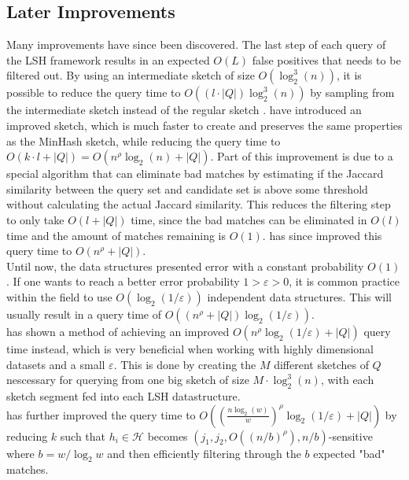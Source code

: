 \subsection{Later Improvements}
Many improvements have since been discovered. The last step of each query of the LSH framework results in an expected $O(L)$ false positives that needs to be filtered out. By using an intermediate sketch of size $O(\log_2^3(n))$, it is possible to reduce the query time to $O((l\cdot |Q|)\log_2^3(n))$ by sampling from the intermediate sketch instead of the regular sketch \cite{dahlgaard2017fast}.
\citet{dahlgaard2017fast} have introduced an improved sketch, which is much faster to create and preserves the same properties as the MinHash sketch, while reducing the query time to $O(k\cdot l + |Q|)=O(n^\rho \log_2(n) + |Q|)$. Part of this improvement is due to a special algorithm that can eliminate bad matches by estimating if the Jaccard similarity between the query set and candidate set is above some threshold without calculating the actual Jaccard similarity. This reduces the filtering step to only take $O(l + |Q|)$ time, since the bad matches can be eliminated in $O(l)$ time and the amount of matches remaining is $O(1)$. \citet{christiani2018fast} has since improved this query time to $O(n^\rho + |Q|)$. \\
Until now, the data structures presented error with a constant probability $O(1)$. If one wants to reach a better error probability $1>\varepsilon>0$, it is common practice within the field to use $O(\log_2(1/\varepsilon))$ independent data structures. This will usually result in a query time of $O((n^\rho + |Q|)\log_2(1/\varepsilon))$. \\
\citet{fast-similarity-search} has shown a method of achieving an improved $O(n^\rho \log_2(1/\varepsilon)+|Q|)$ query time instead, which is very beneficial when working with highly dimensional datasets and a small $\varepsilon$. This is done by creating the $M$ different sketches of $Q$ nescessary for querying from one big sketch of size $M\cdot \log^3_2(n)$, with each sketch segment fed into each LSH datastructure.\\
\citet{fast-similarity-search} has further improved the query time to $O((\frac{n\log_2(w)}{w})^{\rho}\log_2(1/\varepsilon)+|Q|)$ by reducing $k$ such that $h_i\in \mathcal{H}$ becomes $(j_1, j_2, O((n/b)^\rho), n/b)$-sensitive where $b=w/\log_2w$ and then efficiently filtering through the $b$ expected "bad" matches. \\
